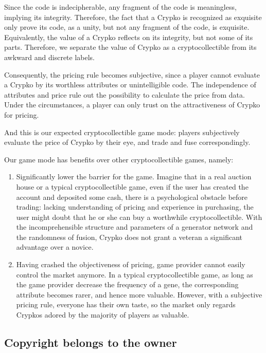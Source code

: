 \documentclass[a4paper]{article}
\begin{document}
Since the code is indecipherable, any fragment of the code is meaningless, implying its integrity. Therefore, the fact that a Crypko is recognized as exquisite only prove its code, as a unity, but not any fragment of the code, is exquisite. Equivalently, the value of a Crypko reflects on its integrity, but not some of its parts. Therefore, we separate the value of Crypko as a cryptocollectible from its awkward and discrete labels.

Consequently, the pricing rule becomes subjective, since a player cannot evaluate a Crypko by its worthless attributes or unintelligible code. The independence of attributes and price rule out the possibility to calculate the price from data. Under the circumstances, a player can only trust on the attractiveness of Crypko for pricing.

And this is our expected cryptocollectible game mode: players subjectively evaluate the price of Crypko by their eye, and trade and fuse correspondingly.

Our game mode has benefits over other cryptocollectible games, namely:

\begin{enumerate}
    \item Significantly lower the barrier for the game. Imagine that in a real auction house or a typical cryptocollectible game, even if the user has created the account and deposited some cash, there is a psychological obstacle before trading: lacking understanding of pricing and experience in purchasing, the user might doubt that he or she can buy a worthwhile cryptocollectible. With the incomprehensible structure and parameters of a generator network and the randomness of fusion, Crypko does not grant a veteran a significant advantage over a novice.
    \item Having crashed the objectiveness of pricing, game provider cannot easily control the market anymore. In a typical cryptocollectible game, as long as the game provider decrease the frequency of a gene, the corresponding attribute becomes rarer, and hence more valuable. However, with a subjective pricing rule, everyone has their own taste, so the market only regards Crypkos adored by the majority of players as valuable.

\end{enumerate}

\subsection{Copyright belongs to the owner}
\end{document}
